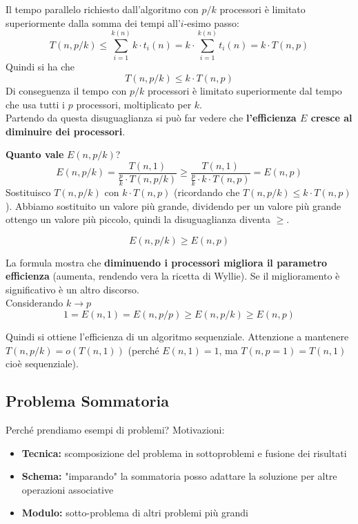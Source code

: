 Il tempo parallelo richiesto dall'algoritmo con $p/k$ processori è limitato superiormente dalla somma dei tempi all'$i$-esimo passo: 
$$ T(n, p/k) \leq \sum_{i = 1}^{k(n)} k \cdot t_i (n) = k \cdot \sum_{i = 1}^{k(n)} t_i (n) = k \cdot T(n, p) $$
Quindi si ha che 
$$ T(n, p/k) \leq k \cdot T(n, p)$$
Di conseguenza il tempo con $p/k$ processori è limitato superiormente dal tempo che usa tutti i $p$ processori, moltiplicato per $k$.\\

Partendo da questa disuguaglianza si può far vedere che \textbf{l'efficienza $E$ cresce al diminuire dei processori}.\\

\newpage

\textbf{Quanto vale} $E \left(n, p/k\right)$?
$$ E \left(n, p/k\right) = \frac{T(n,1)}{\frac{p}{k}  \cdot T(n,p/k)} \geq \frac{T(n,1)}{\frac{p}{k} \cdot k \cdot T(n,p)} = E(n,p) $$
Sostituisco $T(n, p/k)$ con $k \cdot T(n, p)$ (ricordando che $T(n, p/k) \leq k \cdot T(n, p)$). Abbiamo sostituito un valore più grande, dividendo per un valore più grande ottengo un valore più piccolo, quindi la disuguaglianza diventa $\geq$.

$$ E(n, p/k) \geq E(n,p) $$

La formula mostra che \textbf{diminuendo i processori migliora il parametro efficienza} (aumenta, rendendo vera la ricetta di Wyllie). Se il miglioramento è significativo è un altro discorso.\\

Considerando $k \rightarrow p$
$$ 1 = E(n,1) = E(n, p/p) \geq E(n, p/k) \geq E(n,p) $$

Quindi si ottiene l'efficienza di un algoritmo sequenziale. Attenzione a mantenere $T(n, p/k) = o(T(n,1))$ (perché $E(n,1) = 1$, ma $T(n, p=1) = T(n,1)$ cioè sequenziale).\\

\newpage

\subsection{Problema Sommatoria}
Perché prendiamo esempi di problemi? Motivazioni:
\begin{itemize}
	\item \textbf{Tecnica:} scomposizione del problema in sottoproblemi e fusione dei risultati
	\item \textbf{Schema:} "imparando" la sommatoria posso adattare la soluzione per altre operazioni associative
	\item \textbf{Modulo:} sotto-problema di altri problemi più grandi 
\end{itemize}


